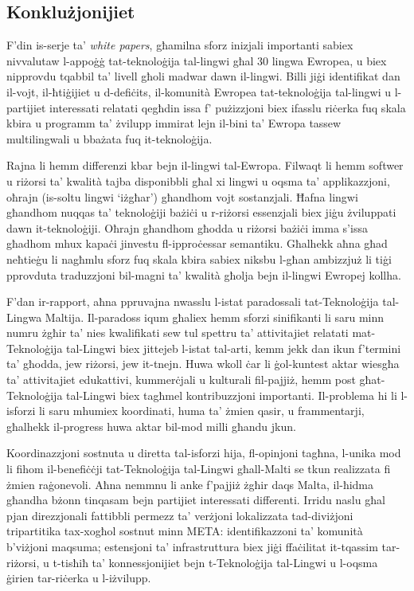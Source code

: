\documentclass[]{../../metanetpaper}
\begin{document}
\begin{multicols}{2}
\subsection{Konklużjonijiet}

F’din is-serje ta’ \emph{white papers}, għamilna sforz inizjali importanti sabiex nivvalutaw l-appoġġ tat-teknoloġija tal-lingwi għal 30 lingwa Ewropea, u biex nipprovdu tqabbil ta’ livell għoli madwar dawn il-lingwi. Billi jiġi identifikat dan il-vojt, il-ħtiġijiet u d-defiċits, il-komunità Ewropea tat-teknoloġija tal-lingwi u l-partijiet interessati relatati qegħdin issa f’ pużizzjoni biex ifasslu riċerka fuq skala kbira u programm ta’ żvilupp immirat lejn il-bini ta’ Ewropa tassew multilingwali u bbażata fuq it-teknoloġija. 

Rajna li hemm differenzi kbar bejn il-lingwi tal-Ewropa. Filwaqt li hemm softwer u riżorsi ta’ kwalità tajba disponibbli għal xi lingwi u oqsma ta’ applikazzjoni, oħrajn (is-soltu lingwi `iżgħar') għandhom vojt sostanzjali.  Ħafna lingwi għandhom nuqqas ta’ teknoloġiji bażiċi u r-riżorsi essenzjali biex jiġu żviluppati dawn it-teknoloġiji. Oħrajn għandhom għodda u riżorsi bażiċi imma s’issa għadhom mhux kapaċi jinvestu fl-ipproċessar semantiku. Għalhekk aħna għad neħtieġu li nagħmlu sforz fuq skala kbira sabiex niksbu l-għan ambizzjuż li tiġi pprovduta traduzzjoni bil-magni ta’ kwalità għolja bejn il-lingwi Ewropej kollha. 

F’dan ir-rapport, aħna ppruvajna nwasslu l-istat paradossali tat-Teknoloġija tal-Lingwa Maltija. Il-paradoss iqum għaliex hemm sforzi sinifikanti li saru minn numru żgħir ta’ nies kwalifikati sew  tul spettru ta’ attivitajiet relatati mat-Teknoloġija tal-Lingwi biex jittejeb l-istat tal-arti, kemm jekk dan ikun f’termini ta’ għodda, jew riżorsi, jew it-tnejn. Huwa wkoll ċar li ġol-kuntest aktar wiesgħa ta’ attivitajiet edukattivi, kummerċjali u kulturali fil-pajjiż, hemm post għat-Teknoloġija tal-Lingwi biex tagħmel kontribuzzjoni importanti. Il-problema hi li l-isforzi li saru mhumiex koordinati, huma ta’ żmien qasir, u frammentarji, għalhekk il-progress huwa aktar bil-mod milli għandu jkun. 

Koordinazzjoni sostnuta u diretta tal-isforzi hija, fl-opinjoni tagħna, l-unika mod li fihom il-benefiċċji tat-Teknoloġija tal-Lingwi għall-Malti se tkun realizzata fi żmien raġonevoli. Aħna nemmnu li anke f’pajjiż żgħir daqs Malta, il-ħidma għandha bżonn tinqasam bejn partijiet interessati differenti. Irridu naslu għal pjan direzzjonali fattibbli permezz ta’ verżjoni lokalizzata tad-diviżjoni tripartitika tax-xogħol sostnut minn META: identifikazzoni ta’ komunità b’viżjoni maqsuma; estensjoni ta’ infrastruttura biex jiġi ffaċilitat it-tqassim tar-riżorsi, u t-tisħiħ ta’ konnessjonijiet bejn t-Teknoloġija tal-Lingwi u l-oqsma ġirien tar-riċerka u l-iżvilupp.
\end{multicols}
\end{document}
